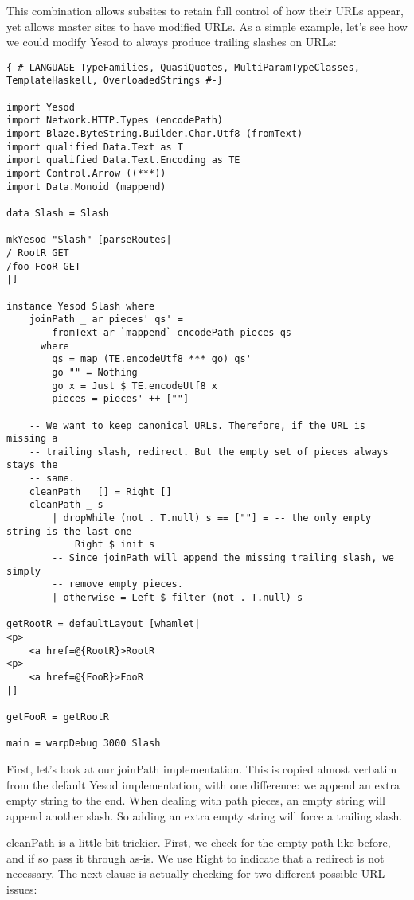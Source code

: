 This combination allows subsites to retain full control of how their URLs appear, yet allows master sites to have modified URLs. As a simple example, let's see how we could modify Yesod to always produce trailing slashes on URLs:

\begin{lstlisting}
{-# LANGUAGE TypeFamilies, QuasiQuotes, MultiParamTypeClasses, TemplateHaskell, OverloadedStrings #-}

import Yesod
import Network.HTTP.Types (encodePath)
import Blaze.ByteString.Builder.Char.Utf8 (fromText)
import qualified Data.Text as T
import qualified Data.Text.Encoding as TE
import Control.Arrow ((***))
import Data.Monoid (mappend)

data Slash = Slash

mkYesod "Slash" [parseRoutes|
/ RootR GET
/foo FooR GET
|]

instance Yesod Slash where
    joinPath _ ar pieces' qs' =
        fromText ar `mappend` encodePath pieces qs
      where
        qs = map (TE.encodeUtf8 *** go) qs'
        go "" = Nothing
        go x = Just $ TE.encodeUtf8 x
        pieces = pieces' ++ [""]

    -- We want to keep canonical URLs. Therefore, if the URL is missing a
    -- trailing slash, redirect. But the empty set of pieces always stays the
    -- same.
    cleanPath _ [] = Right []
    cleanPath _ s
        | dropWhile (not . T.null) s == [""] = -- the only empty string is the last one
            Right $ init s
        -- Since joinPath will append the missing trailing slash, we simply
        -- remove empty pieces.
        | otherwise = Left $ filter (not . T.null) s

getRootR = defaultLayout [whamlet|
<p>
    <a href=@{RootR}>RootR
<p>
    <a href=@{FooR}>FooR
|]

getFooR = getRootR

main = warpDebug 3000 Slash
\end{lstlisting}

First, let's look at our joinPath implementation. This is copied almost verbatim from the default Yesod implementation, with one difference: we append an extra empty string to the end. When dealing with path pieces, an empty string will append another slash. So adding an extra empty string will force a trailing slash.

cleanPath is a little bit trickier. First, we check for the empty path like before, and if so pass it through as-is. We use Right to indicate that a redirect is not necessary. The next clause is actually checking for two different possible URL issues:

